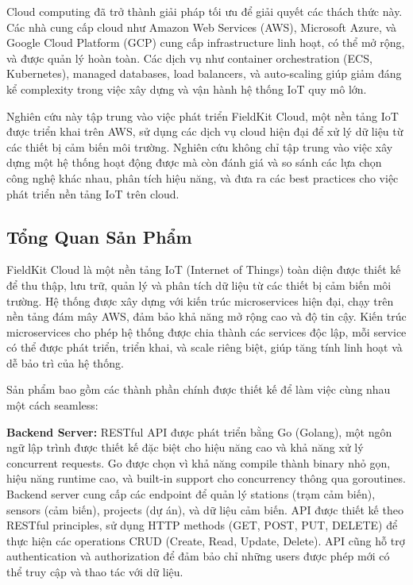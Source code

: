 Cloud computing đã trở thành giải pháp tối ưu để giải quyết các thách thức này. Các nhà cung cấp cloud như Amazon Web Services (AWS), Microsoft Azure, và Google Cloud Platform (GCP) cung cấp infrastructure linh hoạt, có thể mở rộng, và được quản lý hoàn toàn. Các dịch vụ như container orchestration (ECS, Kubernetes), managed databases, load balancers, và auto-scaling giúp giảm đáng kể complexity trong việc xây dựng và vận hành hệ thống IoT quy mô lớn.

Nghiên cứu này tập trung vào việc phát triển FieldKit Cloud, một nền tảng IoT được triển khai trên AWS, sử dụng các dịch vụ cloud hiện đại để xử lý dữ liệu từ các thiết bị cảm biến môi trường. Nghiên cứu không chỉ tập trung vào việc xây dựng một hệ thống hoạt động được mà còn đánh giá và so sánh các lựa chọn công nghệ khác nhau, phân tích hiệu năng, và đưa ra các best practices cho việc phát triển nền tảng IoT trên cloud.

\subsection{Tổng Quan Sản Phẩm}

FieldKit Cloud là một nền tảng IoT (Internet of Things) toàn diện được thiết kế để thu thập, lưu trữ, quản lý và phân tích dữ liệu từ các thiết bị cảm biến môi trường. Hệ thống được xây dựng với kiến trúc microservices hiện đại, chạy trên nền tảng đám mây AWS, đảm bảo khả năng mở rộng cao và độ tin cậy. Kiến trúc microservices cho phép hệ thống được chia thành các services độc lập, mỗi service có thể được phát triển, triển khai, và scale riêng biệt, giúp tăng tính linh hoạt và dễ bảo trì của hệ thống.

Sản phẩm bao gồm các thành phần chính được thiết kế để làm việc cùng nhau một cách seamless:

\textbf{Backend Server:} RESTful API được phát triển bằng Go (Golang), một ngôn ngữ lập trình được thiết kế đặc biệt cho hiệu năng cao và khả năng xử lý concurrent requests. Go được chọn vì khả năng compile thành binary nhỏ gọn, hiệu năng runtime cao, và built-in support cho concurrency thông qua goroutines. Backend server cung cấp các endpoint để quản lý stations (trạm cảm biến), sensors (cảm biến), projects (dự án), và dữ liệu cảm biến. API được thiết kế theo RESTful principles, sử dụng HTTP methods (GET, POST, PUT, DELETE) để thực hiện các operations CRUD (Create, Read, Update, Delete). API cũng hỗ trợ authentication và authorization để đảm bảo chỉ những users được phép mới có thể truy cập và thao tác với dữ liệu.

